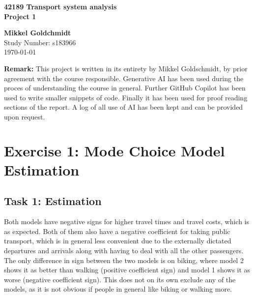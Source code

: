 \documentclass[a4paper,12pt]{article}
\begin{document}
\begin{titlepage}
    \begin{center}
        \vspace*{1cm}
        
        \textbf{42189 Transport system analysis\\Project 1}
        
        \vfill
        
        \textbf{Mikkel Goldchmidt} \\
        Study Number: s183966 \\
        \today
        
        \vfill
        
        \begin{tcolorbox}[colframe=black, colback=gray!10, width=0.8\textwidth, sharp corners]
        \textbf{Remark:} 
        This project is written in its entirety by Mikkel Goldschmidt, by prior agreement with the course responsible. 
        Generative AI has been used during the proces of understanding the course in general.
        Further GitHub Copilot has been used to write smaller snippets of code. 
        Finally it has been used for proof reading sections of the report. A log of all use of AI has been kept and can be provided upon request.
        \end{tcolorbox}
    \end{center}
\end{titlepage}

\section{Exercise 1: Mode Choice Model Estimation}

\subsection{Task 1: Estimation}
Both models have negative signs for higher travel times and travel costs, which is as expected. Both of them also have a negative coefficient for taking public transport, which is in general less convenient due to the externally dictated departures and arrivals along with having to deal with all the other passengers. The only difference in sign between the two models is on biking, where model 2 shows it as better than walking (positive coefficient sign) and model 1 shows it as worse (negative coefficient sign). This does not on its own exclude any of the models, as it is not obvious if people in general like biking or walking more.
\end{document}

